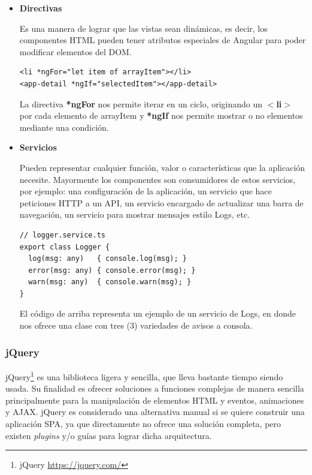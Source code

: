 \begin{itemize}
\item\textbf{Directivas}

Es una manera de lograr que las vistas sean dinámicas, es decir, los componentes HTML pueden tener atributos especiales de Angular para poder modificar elementos del DOM.
\begin{verbatim}
<li *ngFor="let item of arrayItem"></li>
<app-detail *ngIf="selectedItem"></app-detail>
\end{verbatim}
La directiva \textbf{*ngFor} nos permite iterar en un ciclo, originando un \textbf{$<$li$>$} por cada elemento de arrayItem y \textbf{*ngIf} nos permite mostrar o no elementos mediante una condición.

\item\textbf{Servicios}

Pueden representar cualquier función, valor o características que la aplicación necesite. Mayormente los componentes son consumidores de estos servicios, por ejemplo: una configuración de la aplicación, un servicio que hace peticiones HTTP a un API, un servicio encargado de actualizar una barra de navegación, un servicio para mostrar mensajes estilo Logs, etc.
\begin{verbatim}
// logger.service.ts
export class Logger {
  log(msg: any)   { console.log(msg); }
  error(msg: any) { console.error(msg); }
  warn(msg: any)  { console.warn(msg); }
}
\end{verbatim}
El código de arriba representa un ejemplo de un servicio de Logs, en donde nos ofrece una clase con tres (3) variedades de avisos a consola.
\end{itemize}

\subsubsection{jQuery}
jQuery\footnote{jQuery \url{https://jquery.com/}} es una biblioteca ligera y sencilla, que lleva bastante tiempo siendo usada. Su finalidad es ofrecer soluciones a funciones complejas de manera sencilla principalmente para la manipulación de elementos HTML y eventos, animaciones y AJAX. jQuery es considerado una alternativa manual si se quiere construir una aplicación SPA, ya que directamente no ofrece una solución completa, pero existen \textit{plugins} y/o guías para lograr dicha arquitectura.

